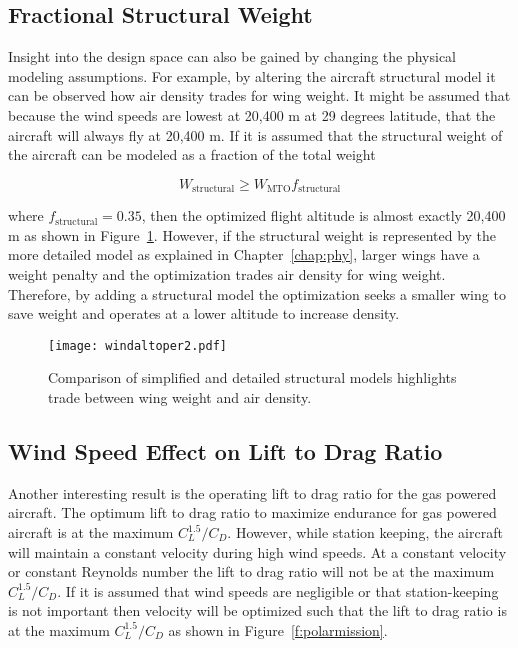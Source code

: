 \subsection{Fractional Structural Weight}

Insight into the design space can also be gained by changing the physical modeling assumptions.
For example, by altering the aircraft structural model it can be observed how air density trades for wing weight. 
It might be assumed that because the wind speeds are lowest at 20,400 m at 29 degrees latitude, that the aircraft will always fly at 20,400 m.  
If it is assumed that the structural weight of the aircraft can be modeled as a fraction of the total weight 

\begin{equation}
    W_{\text{structural}} \geq W_{\text{MTO}} f_{\text{structural}}
\end{equation}

where $f_{\text{structural}} = 0.35$, then the optimized flight altitude is almost exactly 20,400 m as shown in Figure~\ref{f:altoper}.  
However, if the structural weight is represented by the more detailed model as explained in Chapter~\ref{chap:phy}, larger wings have a weight penalty and the optimization trades air density for wing weight.
Therefore, by adding a structural model the optimization seeks a smaller wing to save weight and operates at a lower altitude to increase density. 

\begin{figure}[h!]
	\begin{center}
	\texttt{[image: windaltoper2.pdf]}
 \caption{Comparison of simplified and detailed structural models highlights trade between wing weight and air density.}
 \label{f:altoper}
	\end{center}
\end{figure}

\subsection{Wind Speed Effect on Lift to Drag Ratio}

Another interesting result is the operating lift to drag ratio for the gas powered aircraft.  
The optimum lift to drag ratio to maximize endurance for gas powered aircraft is at the maximum $C_L^{1.5}/C_D$.\cite{br2}  
However, while station keeping, the aircraft will maintain a constant velocity during high wind speeds.  
At a constant velocity or constant Reynolds number the lift to drag ratio will not be at the maximum $C_L^{1.5}/C_D$.  
If it is assumed that wind speeds are negligible or that station-keeping is not important then velocity will be optimized such that the lift to drag ratio is at the maximum $C_L^{1.5}/C_D$ as shown in Figure~\ref{f:polarmission}.

